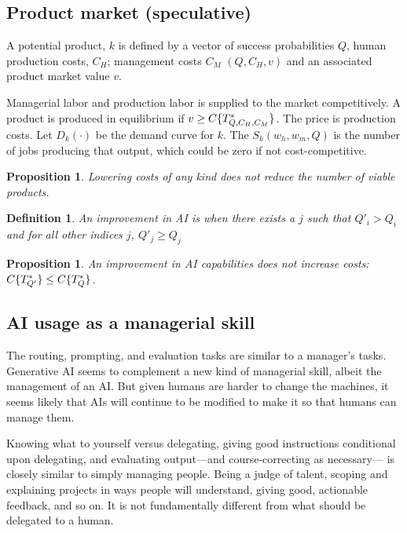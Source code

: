 \documentclass{article}
\newtheorem{proposition}[theorem]{Proposition}
\newtheorem{definition}[theorem]{Definition}
\begin{document}
\subsection{Product market (speculative)}
A potential product, $k$ is defined by a vector of success probabilities $Q$, human production costs, $C_H$; management costs $C_M$   $(Q, C_H, v)$ and an associated product market value $v$.

Managerial labor and production labor is supplied to the market competitively.
A product is produced in equilibrium if $v \ge C\{ T_{Q,C_H,C_M}^* \}$.
The price is production costs. 
Let $D_k(\cdot)$ be the demand curve for $k$.
The $S_k(w_h, w_m, Q)$ is the number of jobs producing that output, which could be zero if not cost-competitive.

\begin{proposition}
Lowering costs of any kind does not reduce the number of viable products.
\end{proposition}

\begin{definition}
An improvement in AI is when there exists a $j$ such that $Q'_i > Q_i$ and for all other indices $j$, $Q'_j \ge Q_j$
\end{definition}

\begin{proposition}
An improvement in AI capabilities does not increase costs: ${C\{ T^*_{Q'} \} \le C\{ T^*_{Q} \}}$.
\end{proposition}


\subsection{AI usage as a managerial skill}
The routing, prompting, and evaluation tasks are similar to a manager's tasks.
Generative AI seems to complement a new kind of managerial skill, albeit the management of an AI. 
But given humans are harder to change the machines, it seems likely that AIs will continue to be modified to make it so that humans can manage them. 

Knowing what to yourself versus delegating, giving good instructions conditional upon delegating, and evaluating output---and course-correcting as necessary--- is closely similar to simply managing people.
Being a judge of talent, scoping and explaining projects in ways people will understand, giving good, actionable feedback, and so on. 
It is not fundamentally different from what should be delegated to a human. 
\end{document}
